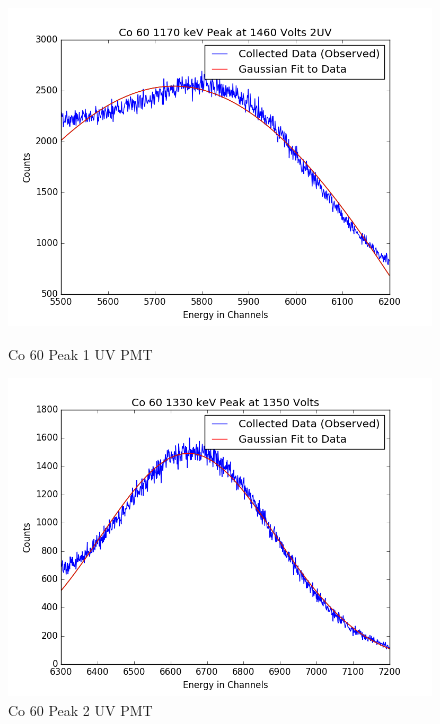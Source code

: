 \documentclass{article}
\begin{document}
\begin{figure}[H]
  \centering
  \begin{minipage}[b]{0.4\textwidth}
    \includegraphics[width=\textwidth]{2UVCo1fit.png}
    \caption{Co 60 Peak 1 UV PMT}
  \end{minipage}
  \hfill
  \begin{minipage}[b]{0.4\textwidth}
    \includegraphics[width=\textwidth]{2UVCo2fit.png}
    \caption{Co 60 Peak 2 UV PMT}
  \end{minipage}
\end{figure}
\end{document}
